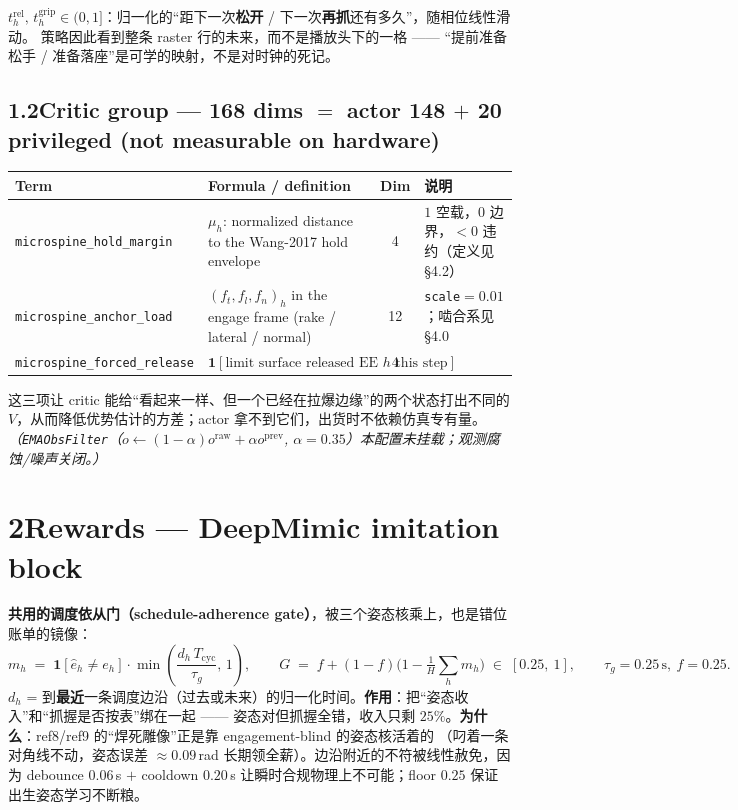 \documentclass[11pt]{article}
\newcommand{\term}[1]{\texttt{\small #1}}
\begin{document}
$t^{\mathrm{rel}}_h,\,t^{\mathrm{grip}}_h\in(0,1]$：归一化的“距下一次\textbf{松开} / 下一次\textbf{再抓}还有多久”，随相位线性滑动。
策略因此看到整条 raster 行的未来，而不是播放头下的一格 —— “提前准备松手 / 准备落座”是可学的映射，不是对时钟的死记。

\subsection*{1.2\quad Critic group — 168 dims $=$ actor 148 $+$ 20 privileged (not measurable on hardware)}
\begin{center}
\begin{tabular}{@{}llcl@{}}
\toprule
Term & Formula / definition & Dim & 说明 \\
\midrule
\term{microspine\_hold\_margin} & $\mu_h$: normalized distance to the Wang-2017 hold envelope & 4 &
  $1$ 空载，$0$ 边界，$<0$ 违约（定义见 §4.2）\\
\term{microspine\_anchor\_load} & $(f_t,f_l,f_n)_h$ in the engage frame (rake / lateral / normal) & 12 & \term{scale}$=0.01$；啮合系见 §4.0 \\
\term{microspine\_forced\_release} & $\mathbf 1[\text{limit surface released EE }h\text{ this step}]$ & 4 & \\
\bottomrule
\end{tabular}
\end{center}

这三项让 critic 能给“看起来一样、但一个已经在拉爆边缘”的两个状态打出不同的 $V$，从而降低优势估计的方差；actor 拿不到它们，出货时不依赖仿真专有量。\\[3pt]
\emph{（\term{EMAObsFilter}（$o \leftarrow (1-\alpha)o^{\mathrm{raw}} + \alpha o^{\mathrm{prev}}$, $\alpha=0.35$）本配置未挂载；观测腐蚀/噪声关闭。）}

\newpage
\section*{2\quad Rewards — DeepMimic imitation block}

\textbf{共用的调度依从门（schedule-adherence gate）}，被三个姿态核乘上，也是错位账单的镜像：
\[
m_h \;=\; \mathbf 1\!\left[\hat e_h \ne e_h\right]\cdot
\min\!\left(\frac{d_h\,T_{\mathrm{cyc}}}{\tau_g},\,1\right),
\qquad
G \;=\; f + (1-f)\Big(1-\tfrac{1}{H}\textstyle\sum_{h} m_h\Big)\;\in\;[0.25,\ 1],
\qquad \tau_g=0.25\,\mathrm{s},\ f=0.25 .
\]
$d_h$ = 到\textbf{最近}一条调度边沿（过去或未来）的归一化时间。\textbf{作用}：把“姿态收入”和“抓握是否按表”绑在一起 ——
姿态对但抓握全错，收入只剩 $25\%$。\textbf{为什么}：ref8/ref9 的“焊死雕像”正是靠 engagement-blind 的姿态核活着的
（叼着一条对角线不动，姿态误差 $\approx 0.09$\,rad 长期领全薪）。边沿附近的不符被线性赦免，因为 debounce $0.06$\,s $+$ cooldown $0.20$\,s
让瞬时合规物理上不可能；floor $0.25$ 保证出生姿态学习不断粮。
\end{document}
